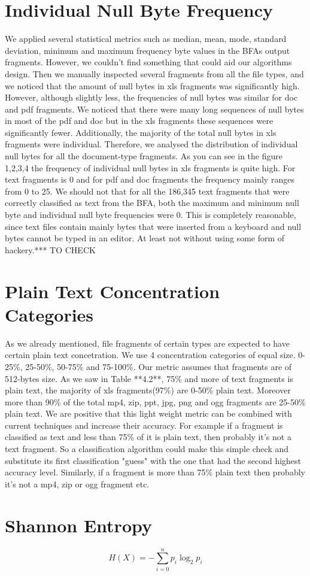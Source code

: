 \section{Individual Null Byte Frequency}
We applied several statistical metrics such as median, mean, mode, standard deviation, minimum and maximum frequency byte values in the BFAs output fragments. However, we couldn't find something that could aid our algorithms design. Then we manually inspected several fragments from all the file types, and we noticed that the amount of null bytes in xls fragments was significantly high. However, although slightly less, the frequencies of null bytes was similar for doc and pdf fragments. We noticed that there were many long sequences of null bytes in most of the pdf and doc but in the xls fragments these sequences were significantly fewer. Additionally, the majority of the total null bytes in xls fragments were individual. Therefore, we analysed the distribution of individual null bytes for all the document-type fragments. As you can see in the figure 1,2,3,4 the frequency of individual null bytes in xls fragments is quite high. For text fragments is 0 and for pdf and doc fragments the frequency mainly ranges from 0 to 25. We should not that for all the 186,345 text fragments that were correctly classified as text from the BFA, both the maximum and minimum null byte and individual null byte frequencies were 0. This is completely reasonable, since text files contain mainly bytes that were inserted from a keyboard and null bytes cannot be typed in an editor. At least not without using some form of hackery.*** TO CHECK


\section{Plain Text Concentration Categories}
As we already mentioned, file fragments of certain types are expected to have certain plain text concetration. We use 4 concentration categories of equal size. 0-25\%, 25-50\%, 50-75\% and 75-100\%. Our metric assumes that fragments are of 512-bytes size. As we saw in Table **4.2**, 75\% and more of text fragments is plain text, the majority of xls fragments(97\%) are 0-50\% plain text. Moreover more than 90\% of the total mp4, zip, ppt, jpg, png and ogg fragments are 25-50\% plain text. We are positive that this light weight metric can be combined with current techniques and increase their accuracy. For example if a fragment is classified as text and less than 75\% of it is plain text, then probably it's not a text fragment. So a classification algorithm could make this simple check and substitute its first classification "guess" with the one that had the second highest accuracy level. Similarly, if a fragment is more than 75\% plain text then probably it's not a mp4, zip or ogg fragment etc.

\section{Shannon Entropy}

 \begin{displaymath}
 H(X)=-\sum_{i=0}^{n}{p_i}\log_2{p_i}
\end{displaymath} 
